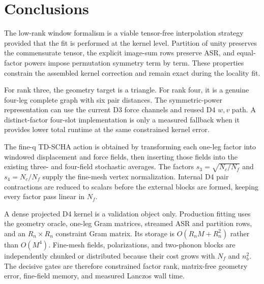 \documentclass{article}
\newcommand{\Nc}{N_c}
\newcommand{\Nf}{N_f}
\begin{document}
\section{Conclusions}
\label{sec:conclusions}

The low-rank window formalism is a viable tensor-free interpolation strategy
provided that the fit is performed at the kernel level. Partition of unity
preserves the commensurate tensor, the explicit image-sum rows preserve ASR,
and equal-factor powers impose permutation symmetry term by term. These
properties constrain the assembled kernel correction and remain exact
during the locality fit.

For rank three, the geometry target is a triangle. For rank four, it is a
genuine four-leg complete graph with six pair distances. The symmetric-power
representation can use the current D3 force channels and reused D4 $w,v$
path. A distinct-factor four-slot implementation is only a measured
fallback when it provides lower total runtime at the same constrained
kernel error.

The fine-q TD-SCHA action is obtained by transforming each one-leg factor
into windowed displacement and force fields, then inserting those fields
into the existing three- and four-field stochastic averages. The factors
$s_3=\sqrt{\Nc/\Nf}$ and $s_4=\Nc/\Nf$ supply the fine-mesh vertex
normalization. Internal D4 pair contractions are reduced to scalars before
the external blocks are formed, keeping every factor pass linear in
$\Nf$.

A dense projected D4 kernel is a validation object only. Production fitting
uses the geometry oracle, one-leg Gram matrices, streamed ASR and partition
rows, and an $R_n\times R_n$ constraint Gram matrix. Its storage is
$O(R_nM+R_n^2)$ rather than $O(M^4)$. Fine-mesh fields, polarizations, and
two-phonon blocks are independently chunked or distributed because their
cost grows with $\Nf$ and $n_b^2$. The decisive gates are therefore
constrained factor rank, matrix-free geometry error, fine-field memory, and
measured Lanczos wall time.
\end{document}
